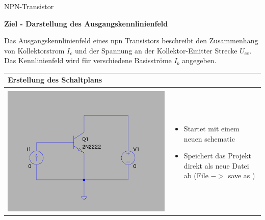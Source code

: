 \begin{frame}[t]{NPN-Transistor}

  \textbf{Ziel - Darstellung des Ausgangskennlinienfeld}
  
  \begin{spacing}{0.6} \begin{tiny}
  
  Das Ausgangskennlinienfeld eines npn Transistors beschreibt den Zusammenhang von Kollektorstrom $I_c$ und der Spannung 
  an der Kollektor-Emitter Strecke $U_{ce}$. Das Kennlinienfeld wird für verschiedene Basisströme $I_b$ angegeben. 
  \end{tiny} \end{spacing}
  \begin{spacing}{0.9} \begin{tiny}
  \begin{table}[h!]
    \begin{tabular}{p{3cm} p{7cm}}
      \hline
      \textbf{Erstellung des Schaltplans} & \\
      \hline \\
      \begin{minipage}{.3\textwidth}
        \includegraphics[width=\linewidth]{pictures/tran.png}
      \end{minipage} 
      & 
      \begin{minipage}{.7\textwidth}
      \begin{itemize}
        \item Startet mit einem neuen schematic
        \item Speichert das Projekt direkt als neue Datei ab (File $->$ save as ) 

\end{itemize}
\end{minipage}
\end{tabular}
\end{table}
\end{tiny}
\end{spacing}
\end{frame}
